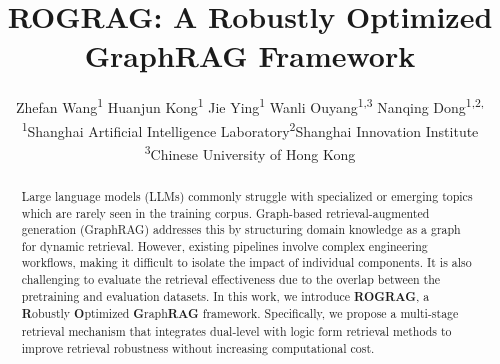 \documentclass[11pt]{article}
\title{ROGRAG: A Robustly Optimized GraphRAG Framework}
\author{
  Zhefan Wang\textsuperscript{1} \quad
  Huanjun Kong\textsuperscript{1}\footnotemark[2] \quad
  Jie Ying\textsuperscript{1} \quad
  Wanli Ouyang\textsuperscript{1,3} \quad
  Nanqing Dong\textsuperscript{1,2,}\footnotemark[1] \quad \\
  \textsuperscript{1}Shanghai Artificial Intelligence Laboratory\textsuperscript{2}Shanghai Innovation Institute \\
  \textsuperscript{3}Chinese University of Hong Kong\\
}
\begin{document}
\maketitle

{
\renewcommand{\thefootnote}{\fnsymbol{footnote}}
{}
}

\begin{abstract}
\setlength{\parindent}{1em}
\hspace*{\parindent}
Large language models (LLMs) commonly struggle with specialized or emerging topics which are rarely seen in the training corpus. Graph-based retrieval-augmented generation (GraphRAG) addresses this by structuring domain knowledge as a graph for dynamic retrieval. However, existing pipelines involve complex engineering workflows, making it difficult to isolate the impact of individual components. It is also challenging to evaluate the retrieval effectiveness due to the overlap between the pretraining 
 and evaluation datasets. 
In this work, we introduce \textbf{ROGRAG}, a \textbf{R}obustly \textbf{O}ptimized \textbf{G}raph\textbf{RAG} framework. Specifically, we propose a multi-stage retrieval mechanism that integrates dual-level with logic form retrieval methods to improve retrieval robustness without increasing computational cost. 

\end{abstract}
\end{document}
